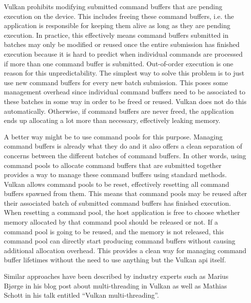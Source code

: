         Vulkan prohibits modifying submitted command buffers that are pending execution on the device.
        This includes freeing these command buffers, i.e. the application is responsible for keeping them alive as long as they are pending execution.
        In practice, this effectively means command buffers submitted in batches may only be modified or reused once the entire submission has finished execution because it is hard to predict when individual commands are processed if more than one command buffer is submitted.
        Out-of-order execution is one reason for this unpredictability.
        The simplest way to solve this problem is to just use new command buffers for every new batch submission.
        This poses some management overhead since individual command buffers need to be associated to these batches in some way in order to be freed or reused.
        Vulkan does not do this automatically.
        Otherwise, if command buffers are never freed, the application ends up allocating a lot more than necessary, effectively leaking memory.

        A better way might be to use command pools for this purpose.
        Managing command buffers is already what they do and it also offers a clean separation of concerns between the different batches of command buffers.
        In other words, using command pools to allocate command buffers that are submitted together provides a way to manage these command buffers using standard methods.
        Vulkan allows command pools to be reset, effectively resetting all command buffers spawned from them.
        This means that command pools may be reused after their associated batch of submitted command buffers has finished execution.
        When resetting a command pool, the host application is free to choose whether memory allocated by that command pool should be released or not.
        If a command pool is going to be reused, and the memory is not released, this command pool can directly start producing command buffers without causing additional allocation overhead.
        This provides a clean way for managing command buffer lifetimes without the need to use anything but the Vulkan \gls{api} itself.

        Similar approaches have been described by industry experts such as Marius Bjørge\cite{bjorge:multithreadingvulkan} in his blog post about multi-threading in Vulkan as well as Mathias Schott\cite{mschott:vulkan_multi_threading} in his talk entitled ``Vulkan multi-threading''.

